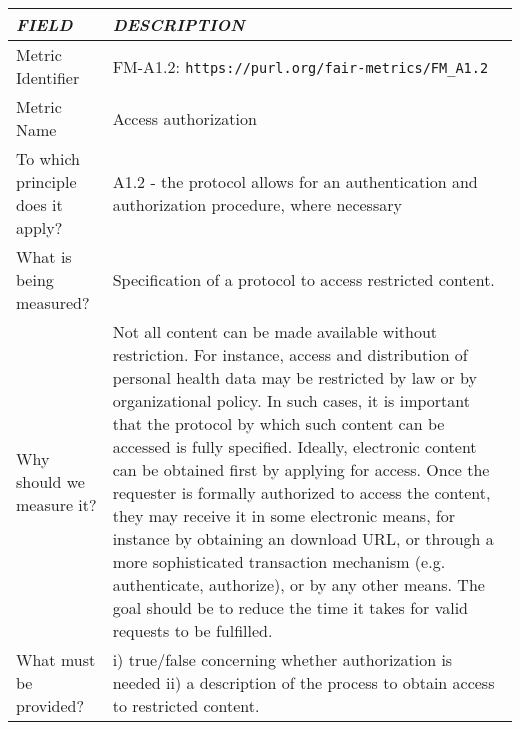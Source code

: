 \documentclass[english]{article}
\begin{document}
\begin{longtable}{|p{5cm}|p{9cm}|}


\hline
\emph{FIELD} & \emph{DESCRIPTION} \\
\hline
Metric Identifier &   FM-A1.2: \verb"https://purl.org/fair-metrics/FM_A1.2"
 \\


\hline
Metric Name &   



Access authorization



 \\



\hline
To which principle does it apply? &   


A1.2 - the protocol allows for an authentication and authorization procedure, where necessary

\\



\hline
What is being measured? & 

Specification of a protocol to access restricted content.


\\



\hline
Why should we measure it? & 


Not all content can be made available without restriction. For instance, access and distribution of personal health data may be restricted by law or by organizational policy. In such cases, it is important that the protocol by which such content can be accessed is fully specified. Ideally, electronic content can be obtained first by applying for access. Once the requester is formally authorized to access the content, they may receive it in some electronic means, for instance by obtaining an download URL, or through a more sophisticated transaction mechanism (e.g. authenticate, authorize), or by any other means. The goal should be to reduce the time it takes for valid requests to be fulfilled. 
  
\\



\hline
What must be provided? &  


i) true/false concerning whether authorization is needed\newline 
ii) a description of the process to obtain access to restricted content.\newline 





\end{longtable}
\end{document}
